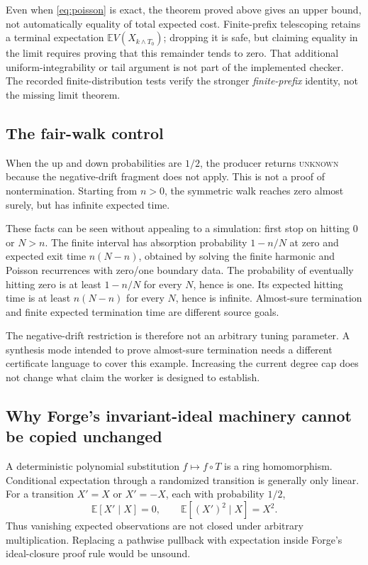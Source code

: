 \documentclass[11pt,letterpaper]{article}
\theoremstyle{definition}\newtheorem{definition}[theorem]{Definition}
\theoremstyle{remark}\newtheorem{remark}[theorem]{Remark}
\newcommand{\E}{\mathbb E}\newcommand{\Prob}{\mathbb P}
\newcommand{\unknown}{\textsc{unknown}}
\begin{document}
Even when \eqref{eq:poisson} is exact, the theorem proved above gives an upper bound, not automatically equality of total expected cost. Finite-prefix telescoping retains a terminal expectation $\E V(X_{k\wedge T_0})$; dropping it is safe, but claiming equality in the limit requires proving that this remainder tends to zero. That additional uniform-integrability or tail argument is not part of the implemented checker. The recorded finite-distribution tests verify the stronger \emph{finite-prefix} identity, not the missing limit theorem.

\subsection{The fair-walk control}
When the up and down probabilities are $1/2$, the producer returns \unknown{} because the negative-drift fragment does not apply. This is not a proof of nontermination. Starting from $n>0$, the symmetric walk reaches zero almost surely, but has infinite expected time.

These facts can be seen without appealing to a simulation: first stop on hitting $0$ or $N>n$. The finite interval has absorption probability $1-n/N$ at zero and expected exit time $n(N-n)$, obtained by solving the finite harmonic and Poisson recurrences with zero/one boundary data. The probability of eventually hitting zero is at least $1-n/N$ for every $N$, hence is one. Its expected hitting time is at least $n(N-n)$ for every $N$, hence is infinite. Almost-sure termination and finite expected termination time are different source goals.

The negative-drift restriction is therefore not an arbitrary tuning parameter. A synthesis mode intended to prove almost-sure termination needs a different certificate language to cover this example. Increasing the current degree cap does not change what claim the worker is designed to establish.

\subsection{Why Forge's invariant-ideal machinery cannot be copied unchanged}
A deterministic polynomial substitution $f\mapsto f\circ T$ is a ring homomorphism. Conditional expectation through a randomized transition is generally only linear. For a transition $X'=X$ or $X'=-X$, each with probability $1/2$,
\[
 \E[X'\mid X]=0,
 \qquad \E[(X')^2\mid X]=X^2.
\]
Thus vanishing expected observations are not closed under arbitrary multiplication. Replacing a pathwise pullback with expectation inside Forge's ideal-closure proof rule would be unsound.
\end{document}
